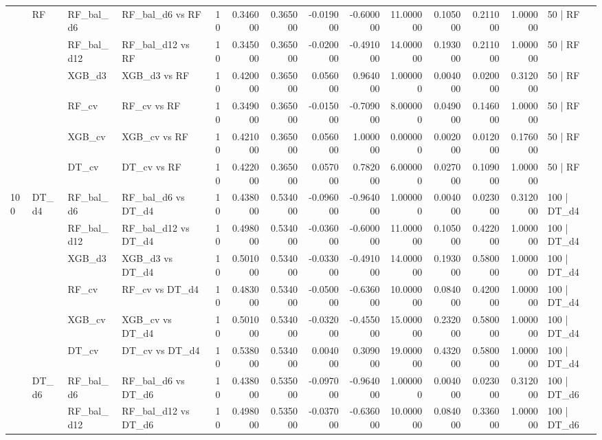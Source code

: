 \begin{tabular}{llllrrrrrrrrrl}
\cline{2-14}
 & \multirow[t]{6}{*}{RF} & RF_bal_d6 & RF_bal_d6 vs RF & 10 & 0.346000 & 0.365000 & -0.019000 & -0.600000 & 11.000000 & 0.105000 & 0.211000 & 1.000000 & 50 | RF \\
 &  & RF_bal_d12 & RF_bal_d12 vs RF & 10 & 0.345000 & 0.365000 & -0.020000 & -0.491000 & 14.000000 & 0.193000 & 0.211000 & 1.000000 & 50 | RF \\
 &  & XGB_d3 & XGB_d3 vs RF & 10 & 0.420000 & 0.365000 & 0.056000 & 0.964000 & 1.000000 & 0.004000 & 0.020000 & 0.312000 & 50 | RF \\
 &  & RF_cv & RF_cv vs RF & 10 & 0.349000 & 0.365000 & -0.015000 & -0.709000 & 8.000000 & 0.049000 & 0.146000 & 1.000000 & 50 | RF \\
 &  & XGB_cv & XGB_cv vs RF & 10 & 0.421000 & 0.365000 & 0.056000 & 1.000000 & 0.000000 & 0.002000 & 0.012000 & 0.176000 & 50 | RF \\
 &  & DT_cv & DT_cv vs RF & 10 & 0.422000 & 0.365000 & 0.057000 & 0.782000 & 6.000000 & 0.027000 & 0.109000 & 1.000000 & 50 | RF \\
\cline{1-14} \cline{2-14}
\multirow[t]{18}{*}{100} & \multirow[t]{6}{*}{DT_d4} & RF_bal_d6 & RF_bal_d6 vs DT_d4 & 10 & 0.438000 & 0.534000 & -0.096000 & -0.964000 & 1.000000 & 0.004000 & 0.023000 & 0.312000 & 100 | DT_d4 \\
 &  & RF_bal_d12 & RF_bal_d12 vs DT_d4 & 10 & 0.498000 & 0.534000 & -0.036000 & -0.600000 & 11.000000 & 0.105000 & 0.422000 & 1.000000 & 100 | DT_d4 \\
 &  & XGB_d3 & XGB_d3 vs DT_d4 & 10 & 0.501000 & 0.534000 & -0.033000 & -0.491000 & 14.000000 & 0.193000 & 0.580000 & 1.000000 & 100 | DT_d4 \\
 &  & RF_cv & RF_cv vs DT_d4 & 10 & 0.483000 & 0.534000 & -0.050000 & -0.636000 & 10.000000 & 0.084000 & 0.420000 & 1.000000 & 100 | DT_d4 \\
 &  & XGB_cv & XGB_cv vs DT_d4 & 10 & 0.501000 & 0.534000 & -0.032000 & -0.455000 & 15.000000 & 0.232000 & 0.580000 & 1.000000 & 100 | DT_d4 \\
 &  & DT_cv & DT_cv vs DT_d4 & 10 & 0.538000 & 0.534000 & 0.004000 & 0.309000 & 19.000000 & 0.432000 & 0.580000 & 1.000000 & 100 | DT_d4 \\
\cline{2-14}
 & \multirow[t]{6}{*}{DT_d6} & RF_bal_d6 & RF_bal_d6 vs DT_d6 & 10 & 0.438000 & 0.535000 & -0.097000 & -0.964000 & 1.000000 & 0.004000 & 0.023000 & 0.312000 & 100 | DT_d6 \\
 &  & RF_bal_d12 & RF_bal_d12 vs DT_d6 & 10 & 0.498000 & 0.535000 & -0.037000 & -0.636000 & 10.000000 & 0.084000 & 0.336000 & 1.000000 & 100 | DT_d6 \\

\end{tabular}
